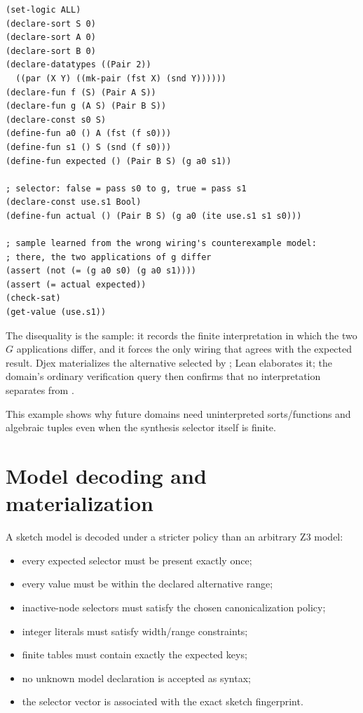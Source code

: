 \documentclass[10pt,letterpaper,oneside]{report}
\newcommand{\code}[1]{\texttt{\detokenize{#1}}}
\begin{document}
\begin{lstlisting}[language=SMTLib,caption={Selector version of the state-threading sketch over uninterpreted sorts and a tuple datatype.}]
(set-logic ALL)
(declare-sort S 0)
(declare-sort A 0)
(declare-sort B 0)
(declare-datatypes ((Pair 2))
  ((par (X Y) ((mk-pair (fst X) (snd Y))))))
(declare-fun f (S) (Pair A S))
(declare-fun g (A S) (Pair B S))
(declare-const s0 S)
(define-fun a0 () A (fst (f s0)))
(define-fun s1 () S (snd (f s0)))
(define-fun expected () (Pair B S) (g a0 s1))

; selector: false = pass s0 to g, true = pass s1
(declare-const use.s1 Bool)
(define-fun actual () (Pair B S) (g a0 (ite use.s1 s1 s0)))

; sample learned from the wrong wiring's counterexample model:
; there, the two applications of g differ
(assert (not (= (g a0 s0) (g a0 s1))))
(assert (= actual expected))
(check-sat)
(get-value (use.s1))
\end{lstlisting}

The disequality is the sample: it records the finite interpretation in which the two $G$ applications differ, and it forces the only wiring that agrees with the expected result. Djex materializes the alternative selected by \code{use.s1}; Lean elaborates it; the domain's ordinary verification query then confirms that no interpretation separates \code{actual} from \code{expected}.


This example shows why future domains need uninterpreted sorts/functions and algebraic tuples even when the synthesis selector itself is finite.

\section{Model decoding and materialization}

A sketch model is decoded under a stricter policy than an arbitrary Z3 model:

\begin{itemize}
\item every expected selector must be present exactly once;
\item every value must be within the declared alternative range;
\item inactive-node selectors must satisfy the chosen canonicalization policy;
\item integer literals must satisfy width/range constraints;
\item finite tables must contain exactly the expected keys;
\item no unknown model declaration is accepted as syntax;
\item the selector vector is associated with the exact sketch fingerprint.
\end{itemize}
\end{document}
